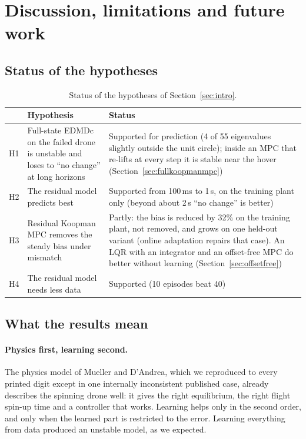 \section{Discussion, limitations and future work}\label{sec:discussion}
\subsection{Status of the hypotheses}
\begin{table}[H]
\centering\small
\caption{Status of the hypotheses of Section~\ref{sec:intro}.}\label{tab:hyp}
\begin{tabularx}{\linewidth}{l L p{5.6cm}}
\toprule
& Hypothesis & Status \\
\midrule
H1 & Full-state EDMDc on the failed drone is unstable and loses to ``no change'' at long horizons & Supported for prediction (4 of 55 eigenvalues slightly outside the unit circle); inside an MPC that re-lifts at every step it is stable near the hover (Section~\ref{sec:fullkoopmanmpc}) \\
H2 & The residual model predicts best & Supported from 100\,ms to 1\,s, on the training plant only (beyond about 2\,s ``no change'' is better) \\
H3 & Residual Koopman MPC removes the steady bias under mismatch & Partly: the bias is reduced by 32\% on the training plant, not removed, and grows on one held-out variant (online adaptation repairs that case). An LQR with an integrator and an offset-free MPC do better without learning (Section~\ref{sec:offsetfree}) \\
H4 & The residual model needs less data & Supported (10 episodes beat 40) \\
\bottomrule
\end{tabularx}
\end{table}

\subsection{What the results mean}
\paragraph{Physics first, learning second.} The physics model of Mueller and D'Andrea, which we reproduced to every printed digit except in one internally inconsistent published case, already describes the spinning drone well: it gives the right equilibrium, the right flight spin-up time and a controller that works. Learning helps only in the second order, and only when the learned part is restricted to the error. Learning everything from data produced an unstable model, as we expected.

